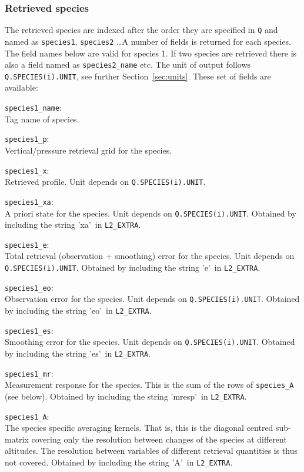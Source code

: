 \documentclass[a4paper,11pt]{article}
\newcommand{\newfield}{\vspace{1ex}\noindent}
\begin{document}
\subsubsection{Retrieved species}
%
The retrieved species are indexed after the order they are specified in
\verb|Q| and named as \verb|species1|, \verb|species2| \dots A number of fields
is returned for each species. The field names below are valid for species 1. If
two species are retrieved there is also a field named as \verb|species2_name|
etc. The unit of output follows \verb|Q.SPECIES(i).UNIT|, see further
Section~\ref{sec:units}. These set of fields are available:

\newfield 
\verb|species1_name|:\\
Tag name of species.

\newfield 
\verb|species1_p|:\\
Vertical/pressure retrieval grid for the species.

\newfield 
\verb|species1_x|:\\
Retrieved profile. Unit depends on \verb|Q.SPECIES(i).UNIT|.

\newfield 
\verb|species1_xa|:\\
A priori state for the species. Unit depends on \verb|Q.SPECIES(i).UNIT|.
Obtained by including the string \rq xa\rq\ in \verb|L2_EXTRA|.

\newfield 
\verb|species1_e|:\\
Total retrieval (observation + smoothing) error for the species. 
Unit depends on \verb|Q.SPECIES(i).UNIT|.
Obtained by including the string \rq e\rq\ in \verb|L2_EXTRA|.

\newfield 
\verb|species1_eo|:\\
Observation error for the species. Unit depends on \verb|Q.SPECIES(i).UNIT|.
Obtained by including the string \rq eo\rq\ in \verb|L2_EXTRA|.

\newfield 
\verb|species1_es|:\\
Smoothing error for the species. Unit depends on \verb|Q.SPECIES(i).UNIT|.
Obtained by including the string \rq es\rq\ in \verb|L2_EXTRA|.

\newfield
\verb|species1_mr|:\\
Measurement response for the species. This is the sum of the rows of
\verb|species_A| (see below).
Obtained by including the string \rq mresp\rq\ in \verb|L2_EXTRA|.

\newfield
\verb|species1_A|:\\
The species specific averaging kernels. That is, this is the diagonal
centred sub-matrix covering only the resolution between changes of the
species at different altitudes. The resolution between variables of
different retrieval quantities is thus not covered.
Obtained by including the string \rq A\rq\ in \verb|L2_EXTRA|.
\end{document}
